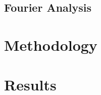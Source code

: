 \documentclass[10pt]{article}
\begin{document}
\subsection{Fourier Analysis}


\section{Methodology}



\section{Results}

\end{document}
